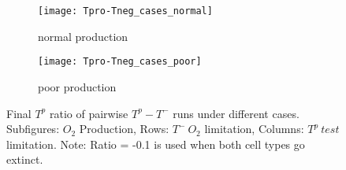 \begin{figure}[h!]
  \centering
  \begin{subfigure}[b]{\textwidth}
    \centering
    \texttt{[image: Tpro-Tneg\_cases\_normal]}
    \caption{normal production}
    \label{fig_Tpro-Tneg_cases_normal}
  \end{subfigure}
  \begin{subfigure}[b]{\textwidth}
    \centering
    \texttt{[image: Tpro-Tneg\_cases\_poor]}
    \caption{poor production}
    \label{fig_Tpro-Tneg_cases_poor}
  \end{subfigure}
  \caption[Final $T^p$ ratio of pairwise $T^p - T^-$ runs under different cases]{Final $T^p$ ratio of pairwise $T^p - T^-$ runs under different cases. Subfigures: $O_2$ Production, Rows: $T^-\ O_2$ limitation, Columns: $T^p\ test$ limitation. Note: Ratio = -0.1 is used when both cell types go extinct.}
  \label{fig_Tpro-Tneg_cases}
\end{figure}

\clearpage

